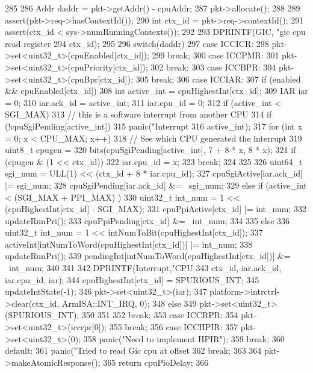 \begin{DoxyCode}
285 {
286     Addr daddr = pkt->getAddr() - cpuAddr;
287     pkt->allocate();
288 
289     assert(pkt->req->hasContextId());
290     int ctx_id = pkt->req->contextId();
291     assert(ctx_id < sys->numRunningContexts());
292 
293     DPRINTF(GIC, "gic cpu read register %
294             ctx_id);
295 
296     switch(daddr) {
297       case ICCICR:
298         pkt->set<uint32_t>(cpuEnabled[ctx_id]);
299         break;
300       case ICCPMR:
301         pkt->set<uint32_t>(cpuPriority[ctx_id]);
302         break;
303       case ICCBPR:
304         pkt->set<uint32_t>(cpuBpr[ctx_id]);
305         break;
306       case ICCIAR:
307         if (enabled && cpuEnabled[ctx_id]) {
308             int active_int = cpuHighestInt[ctx_id];
309             IAR iar = 0;
310             iar.ack_id = active_int;
311             iar.cpu_id = 0;
312             if (active_int < SGI_MAX) {
313                 // this is a software interrupt from another CPU
314                 if (!cpuSgiPending[active_int])
315                     panic("Interrupt %
316                             active_int);
317                 for (int x = 0; x < CPU_MAX; x++) {
318                     // See which CPU generated the interrupt
319                     uint8_t cpugen =
320                         bits(cpuSgiPending[active_int], 7 + 8 * x, 8 * x);
321                     if (cpugen & (1 << ctx_id)) {
322                         iar.cpu_id = x;
323                         break;
324                     }
325                 }
326                 uint64_t sgi_num = ULL(1) << (ctx_id + 8 * iar.cpu_id);
327                 cpuSgiActive[iar.ack_id] |= sgi_num;
328                 cpuSgiPending[iar.ack_id] &= ~sgi_num;
329             } else if (active_int < (SGI_MAX + PPI_MAX) ) {
330                 uint32_t int_num = 1 << (cpuHighestInt[ctx_id] - SGI_MAX);
331                 cpuPpiActive[ctx_id] |= int_num;
332                 updateRunPri();
333                 cpuPpiPending[ctx_id] &= ~int_num;
334 
335             } else {
336                 uint32_t int_num = 1 << intNumToBit(cpuHighestInt[ctx_id]);
337                 activeInt[intNumToWord(cpuHighestInt[ctx_id])] |= int_num;
338                 updateRunPri();
339                 pendingInt[intNumToWord(cpuHighestInt[ctx_id])] &= ~int_num;
340             }
341 
342             DPRINTF(Interrupt,"CPU %
343                     ctx_id, iar.ack_id, iar.cpu_id, iar);
344             cpuHighestInt[ctx_id] = SPURIOUS_INT;
345             updateIntState(-1);
346             pkt->set<uint32_t>(iar);
347             platform->intrctrl->clear(ctx_id, ArmISA::INT_IRQ, 0);
348         } else {
349              pkt->set<uint32_t>(SPURIOUS_INT);
350         }
351 
352         break;
353       case ICCRPR:
354         pkt->set<uint32_t>(iccrpr[0]);
355         break;
356       case ICCHPIR:
357         pkt->set<uint32_t>(0);
358         panic("Need to implement HPIR");
359         break;
360       default:
361         panic("Tried to read Gic cpu at offset %
362         break;
363     }
364     pkt->makeAtomicResponse();
365     return cpuPioDelay;
366 }
\end{DoxyCode}
